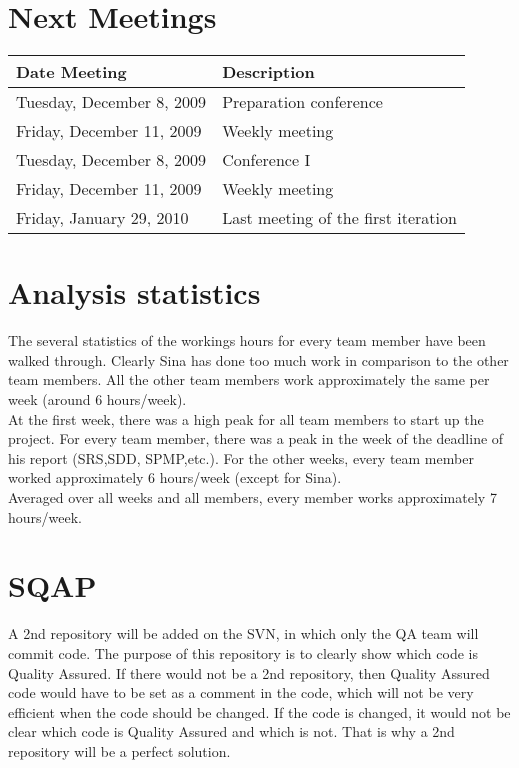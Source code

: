 \documentclass[a4paper, 12pt]{article}
\begin{document}
	\section{Next Meetings}
			\begin{tabular}{l | l }
				\textbf{Date Meeting} & \textbf{Description} \\
				\hline
				Tuesday, December 8, 2009 & Preparation conference \\
				Friday, December 11, 2009 & Weekly meeting \\
				Tuesday, December 8, 2009 & Conference I \\
				Friday, December 11, 2009 & Weekly meeting \\
				Friday, January 29, 2010 & Last meeting of the first iteration \\
			\end{tabular}	
	\section{Analysis statistics}
		The several statistics of the workings hours for every team member have been walked through. Clearly Sina has done too much work in comparison to the other team members. All the other team members work approximately the same per week (around 6 hours/week). \\
		At the first week, there was a high peak for all team members to start up the project. For every team member, there was a peak in the week of the deadline of his report (SRS,SDD, SPMP,etc.). For the other weeks, every team member worked approximately 6 hours/week (except for Sina). \\ Averaged over all weeks and all members, every member works approximately 7 hours/week. 
		

	\section{SQAP}
A 2nd repository will be added on the SVN, in which only the QA team will commit code. The purpose of this repository is to clearly show which code is Quality Assured. If there would not be a 2nd repository, then Quality Assured code would have to be set as a comment in the code, which will not be very efficient when the code should be changed. If the code is changed, it would not be clear which code is Quality Assured and which is not. That is why a 2nd repository will be a perfect solution.
 
\end{document}
